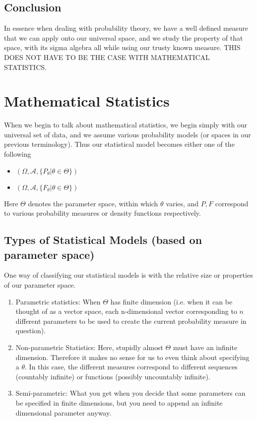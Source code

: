 \documentclass[12pt]{book}
\theoremstyle{definition}
\begin{document}
\subsection*{Conclusion}
In essence when dealing with probability theory, we have a well defined measure that we can apply onto our universal space, and we study the property of that space, with its sigma algebra all while using our trusty known measure. THIS DOES NOT HAVE TO BE THE CASE WITH MATHEMATICAL STATISTICS.
\section{Mathematical Statistics}
When we begin to talk about mathematical statistics, we begin simply with our universal set of data, and we assume various probability models (or spaces in our previous terminology). Thus our statistical model becomes either one of the following \begin{itemize}
    \item $(\Omega, \mathcal{A}, \{P_{\theta}| \theta \in \Theta\})$
    \item $(\Omega, \mathcal{A}, \{F_{\theta}| \theta \in \Theta\})$ 
\end{itemize}
Here $\Theta$ denotes the parameter space, within which $\theta$ varies, and $P, F$ correspond to various probability measures or density functions respectively.
\subsection{Types of Statistical Models (based on parameter space)}
One way of classifying our statistical models is with the relative size or properties of our parameter space. 
\begin{enumerate}
    \item Parametric statistics: When $\Theta$ has finite dimension (i.e. when it can be thought of as a vector space, each n-dimensional vector corresponding to $n$ different parameters to be used to create the current probability measure in question).
    \item Non-parametric Statistics: Here, stupidly almost $\Theta$ must have an infinite dimension. Therefore it makes no sense for us to even think about specifying a $\theta$. In this case, the different measures correspond to different sequences (countably infinite) or functions (possibly uncountably infinite).
    \item Semi-parametric: What you get when you decide that some parameters can be specified in finite dimensions, but you need to append an infinite dimensional parameter anyway.
\end{enumerate}
\end{document}
